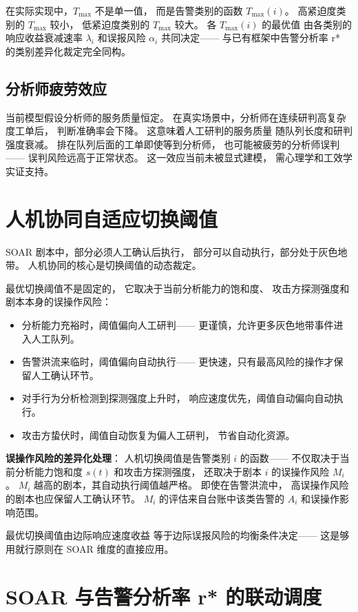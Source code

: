 \documentclass[11pt,a4paper]{article}
\begin{document}
在实际实现中，\(T_{\max}\) 不是单一值，
而是告警类别的函数 \(T_{\max}(i)\)。
高紧迫度类别的 \(T_{\max}\) 较小，
低紧迫度类别的 \(T_{\max}\) 较大。
各 \(T_{\max}(i)\) 的最优值
由各类别的响应收益衰减速率 \(\lambda_i\)
和误报风险 \(\alpha_i\) 共同决定——
与已有框架中告警分析率 r* 的类别差异化裁定完全同构。

\subsection{分析师疲劳效应}

当前模型假设分析师的服务质量恒定。
在真实场景中，分析师在连续研判高复杂度工单后，
判断准确率会下降。
这意味着人工研判的服务质量
随队列长度和研判强度衰减。
排在队列后面的工单即使等到分析师，
也可能被疲劳的分析师误判——
误判风险远高于正常状态。
这一效应当前未被显式建模，
需心理学和工效学实证支持。

\section{人机协同自适应切换阈值}

SOAR 剧本中，部分必须人工确认后执行，
部分可以自动执行，部分处于灰色地带。
人机协同的核心是切换阈值的动态裁定。

最优切换阈值不是固定的，
它取决于当前分析能力的饱和度、
攻击方探测强度和剧本本身的误操作风险：
\begin{itemize}
    \item 分析能力充裕时，阈值偏向人工研判——
          更谨慎，允许更多灰色地带事件进入人工队列。
    \item 告警洪流来临时，阈值偏向自动执行——
          更快速，只有最高风险的操作才保留人工确认环节。
    \item 对手行为分析检测到探测强度上升时，
          响应速度优先，阈值自动偏向自动执行。
    \item 攻击方蛰伏时，阈值自动恢复为偏人工研判，
          节省自动化资源。
\end{itemize}

\textbf{误操作风险的差异化处理}：
人机切换阈值是告警类别 \(i\) 的函数——
不仅取决于当前分析能力饱和度 \(s(t)\)
和攻击方探测强度，
还取决于剧本 \(i\) 的误操作风险 \(M_i\)。
\(M_i\) 越高的剧本，其自动执行阈值越严格。
即使在告警洪流中，
高误操作风险的剧本也应保留人工确认环节。
\(M_i\) 的评估来自台账中该类告警的 \(A_i\)
和误操作影响范围。

最优切换阈值由边际响应速度收益
等于边际误报风险的均衡条件决定——
这是够用就行原则在 SOAR 维度的直接应用。

\section{SOAR 与告警分析率 r* 的联动调度}
\end{document}
